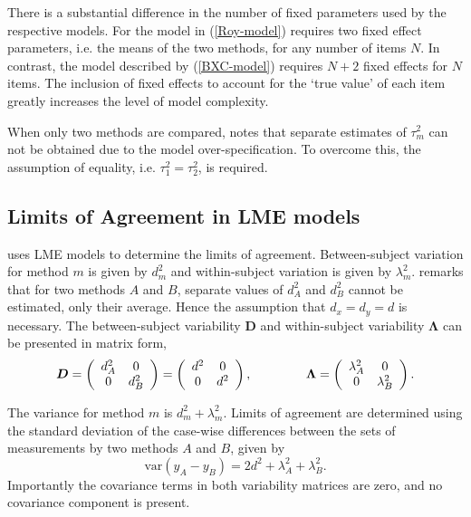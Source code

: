 \documentclass[12pt, a4paper]{report}
\theoremstyle{plain}
\theoremstyle{definition}
\theoremstyle{remark}
\begin{document}
There is a substantial difference in the number of fixed parameters used by the respective models. For the model in (\ref{Roy-model}) requires two fixed effect parameters, i.e. the means of the two methods, for any number of items $N$. In contrast, the model described by (\ref{BXC-model}) requires $N+2$ fixed effects for $N$ items. The inclusion of fixed effects to account for the `true value' of each item greatly increases the level of model complexity.

When only two methods are compared, \citet{BXC2008} notes that separate estimates of $\tau^2_m$ can not be obtained due to the model over-specification. To overcome this, the assumption of equality, i.e. $\tau^2_1 = \tau^2_2$, is required.
\newpage

\newpage

\subsection{Limits of Agreement in LME models}
\citet{BXC2008} uses LME models to determine the limits of agreement. Between-subject variation for method $m$ is given by $d^2_{m}$ and within-subject variation is given by $\lambda^2_{m}$.  \citet{BXC2008} remarks that for two methods $A$ and $B$, separate values of $d^2_{A}$ and $d^2_{B}$ cannot be estimated, only their average. Hence the assumption that $d_{x}= d_{y}= d$ is necessary. The between-subject variability $\boldsymbol{D}$ and within-subject variability $\boldsymbol{\Lambda}$ can be presented in matrix form,\[
\boldsymbol{D} = \left(%
\begin{array}{cc}
d^2_{A}& 0 \\
0 & d^2_{B} \\
\end{array}%
\right)=\left(%
\begin{array}{cc}
d^2& 0 \\
0 & d^2\\
\end{array}%
\right),
\hspace{1.5cm}
\boldsymbol{\Lambda} = \left(%
\begin{array}{cc}
\lambda^2_{A}& 0 \\
0 & \lambda^2_{B} \\
\end{array}%
\right).
\]

The variance for method $m$ is $d^2_{m}+\lambda^2_{m}$. Limits of agreement are determined using the standard deviation of the case-wise differences between the sets of measurements by two methods $A$ and $B$, given by
\begin{equation}
\mbox{var} (y_{A}-y_{B}) = 2d^2 + \lambda^2_{A}+ \lambda^2_{B}.
\end{equation}
Importantly the covariance terms in both variability matrices are zero, and no covariance component is present.
\end{document}
